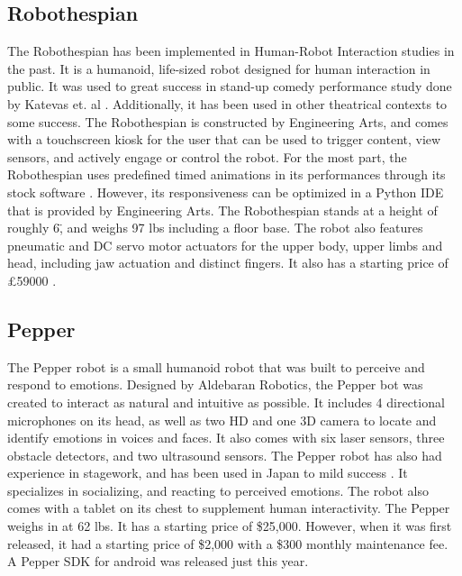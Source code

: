 \documentclass[onecolumn, draftclsnofoot,10pt, compsoc]{IEEEtran}
\begin{document}
\subsection{Robothespian}
The Robothespian has been implemented in Human-Robot Interaction studies in the past.
It is a humanoid, life-sized robot designed for human interaction in public.
It was used to great success in stand-up comedy performance study done by Katevas et. al \cite{KatevasRobot:2014}.
Additionally, it has been used in other theatrical contexts \cite{Spillikin} to some success.
The Robothespian is constructed by Engineering Arts, and comes with a touchscreen kiosk for the user that can be used to trigger content, view sensors, and actively engage or control the robot.
For the most part, the Robothespian uses predefined timed animations in its performances through its stock software \cite{KatevasRobot:2014}.
However, its responsiveness can be optimized in a Python IDE that is provided by Engineering Arts.
The Robothespian stands at a height of roughly 6\", and weighs 97 lbs including a floor base.
The robot also features pneumatic and DC servo motor actuators for the upper body, upper limbs and head, including jaw actuation and distinct fingers.
It also has a starting price of \pounds59000 \cite{EngineeredArts}.


\subsection{Pepper}
The Pepper robot is a small humanoid robot that was built to perceive and respond to emotions.
Designed by Aldebaran Robotics, the Pepper bot was created to interact as natural and intuitive as possible.
It includes 4 directional microphones on its head, as well as two HD and one 3D camera to locate and identify emotions in voices and faces.
It also comes with six laser sensors, three obstacle detectors, and two ultrasound sensors.
The Pepper robot has also had experience in stagework, and has been used in Japan to mild success \cite{PepperVid}.
It specializes in socializing, and reacting to perceived emotions.
The robot also comes with a tablet on its chest to supplement human interactivity.
The Pepper weighs in at 62 lbs.
It has a starting price of \$25,000. However, when it was first released, it had a starting price of \$2,000 with a \$300 monthly maintenance fee.
A Pepper SDK for android was released just this year. \cite{PepperBot}
\end{document}
